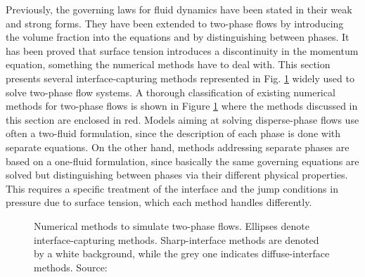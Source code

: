 Previously, the governing laws for fluid dynamics have been stated in their weak and strong forms. They have been extended to two-phase flows by introducing the volume fraction into the equations and by distinguishing between phases. It has been proved that surface tension introduces a discontinuity in the momentum equation, something the numerical methods have to deal with. This section presents several interface-capturing methods represented in Fig. \ref{fig:classification_numerical_methods_mirjalili} widely used to solve two-phase flow systems. A thorough classification of existing numerical methods for two-phase flows is shown in Figure \ref{fig:classification_numerical_methods_mirjalili}  where the methods discussed in this section are enclosed in red. Models aiming at solving disperse-phase flows use often a two-fluid formulation, since the description of each phase is done with separate equations. On the other hand, methods addressing separate phases are based on a one-fluid formulation, since basically the same governing equations are solved but distinguishing between phases via their different physical properties. This requires a specific treatment of the interface and the jump conditions in pressure due to surface tension, which each method handles differently. 




\begin{figure}[h!]
	\centering
{}
	\caption[Numerical methods to simulate two-phase flows.]{Numerical methods to simulate two-phase flows. Ellipses denote interface-capturing methods. Sharp-interface methods are denoted by a white background, while the grey one indicates diffuse-interface methods. Source: }	\label{fig:classification_numerical_methods_mirjalili}
\end{figure}




